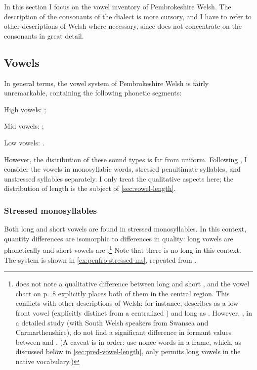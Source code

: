 In this section I focus on the vowel inventory of Pembrokeshire Welsh. The description of the consonants of the dialect is more cursory, and I have to  refer to other descriptions of Welsh where necessary, since \citet{awbery86:_pembr_welsh} does not concentrate on the consonants in great detail.

\subsection{Vowels}
\label{sec:vowels}

In general terms, the vowel system of Pembrokeshire Welsh is fairly unremarkable, containing the following phonetic segments:

\begin{itemize*}
\item High vowels: ;
\item Mid vowels: ;
\item Low vowels: .
\end{itemize*}

However, the distribution of these sound types is far from uniform. Following \citet{awbery86:_pembr_welsh}, I consider the vowels in monosyllabic words, stressed penultimate syllables, and unstressed syllables separately. I only treat the qualitative aspects here; the distribution of length is the subject of  \cref{sec:vowel-length}.

\subsubsection{Stressed monosyllables}
\label{sec:stress-monosyll}

Both long and short vowels are found in stressed monosyllables. In this context, quantity differences are isomorphic to differences in quality: long vowels are phonetically  and short vowels are .\footnote{\citet{awbery86:_pembr_welsh} does not note a qualitative difference between long and short \ipa{[a]}, and the vowel chart on p.~8 explicitly places both of them in the central region. This conflicts with other descriptions of Welsh: for instance, \citet{jones} describes \ipa{[a]} as a low front vowel (explicitly distinct from a centralized ) and long  as . However,  \textcite{mayr11:_welsh}, in a detailed study (with South Welsh speakers from Swansea and Carmarthenshire), do not find a significant difference in formant values between \ipa{[a]} and \ipa{[aː]}. (A caveat is in order: \citeauthor{mayr11:_welsh} \cite*{mayr11:_welsh} use nonce words in a \ipa{[hVd]} frame, which, as discussed below in \cref{sec:pred-vowel-length}, only permits long vowels in the native vocabulary.)} Note that there is no long  in this context. The system is shown in \cref{ex:penfro-stressed-ms}, repeated from \citet[p.~8]{awbery86:_pembr_welsh}.

